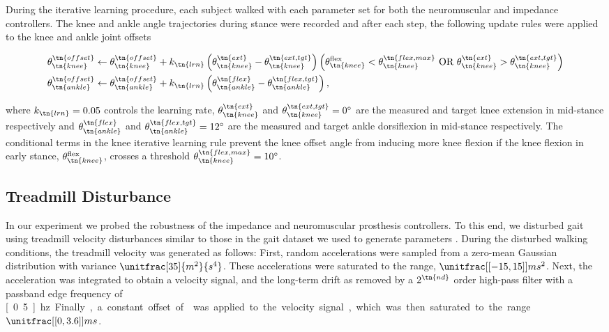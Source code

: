 During the iterative learning procedure, each subject walked with each parameter
set for both the neuromuscular and impedance controllers. The knee and ankle
angle trajectories during stance were recorded and after each step, the
following update rules were applied to the knee and ankle joint offsets
\begin{fullwidth}
\begin{align}
    \theta_\tn{knee}^\tn{offset} &\leftarrow \theta_\tn{knee}^\tn{offset} +
    k_\tn{lrn} \left(\theta_\tn{knee}^\tn{ext} - \theta_\tn{knee}^\tn{ext,tgt} \right)
    \left(\theta_\tn{knee}^\textrm{flex} < \theta_\tn{knee}^\tn{flex,max}
    \textrm{~OR~} \theta_\tn{knee}^\tn{ext} > \theta_\tn{knee}^\tn{ext,tgt}\right)\\
    \theta_\tn{ankle}^\tn{offset} &\leftarrow \theta_\tn{ankle}^\tn{offset} +
    k_\tn{lrn} \left(\theta_\tn{ankle}^\tn{flex} - \theta_\tn{ankle}^\tn{flex,tgt} \right),
\end{align}
\end{fullwidth}
where $k_\tn{lrn} = 0.05$ controls the learning rate,
$\theta_\tn{knee}^\tn{ext}$ and $\theta_\tn{knee}^\tn{ext,tgt} = 0^\circ$ are
the measured and target knee extension in mid-stance respectively and
$\theta_\tn{ankle}^\tn{flex}$ and $\theta_\tn{ankle}^\tn{flex,tgt} = 12^\circ$
are the measured and target ankle dorsiflexion in mid-stance respectively. The
conditional terms in the knee iterative learning rule prevent the knee offset
angle from inducing more knee flexion if the knee flexion in early stance,
$\theta_\tn{knee}^\textrm{flex}$, crosses a threshold
$\theta_\tn{knee}^\tn{flex,max} = 10^\circ$.

\subsection{Treadmill Disturbance}\label{sec:treadmill_exp_disturbance}
In our experiment we probed the robustness of the impedance and neuromuscular
prosthesis controllers. To this end, we disturbed gait using treadmill velocity
disturbances similar to those in the gait dataset we used to generate parameters
\citep{moore2015elaborate}. During the disturbed walking conditions, the
treadmill velocity was generated as follows: First, random accelerations were
sampled from a zero-mean Gaussian distribution with variance
$\unitfrac[35]{m^2}{s^4}$. These accelerations were saturated to the range,
$\unitfrac[{[-15, 15]}]{m}{s^2}$. Next, the acceleration was integrated to
obtain a velocity signal, and the long-term drift as removed by a $2^\tn{nd}$
order high-pass filter with a passband edge frequency of \unit[0.5]{hz}.
Finally, a constant offset of  was applied to the velocity
signal, which was then saturated to the range $\unitfrac[{[0, 3.6]}]{m}{s}$.

